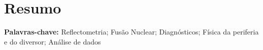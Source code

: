 
\section*{Resumo}



\vfill

\textbf{\Large Palavras-chave:} Reflectometria; Fusão Nuclear;  Diagnósticos; Física da periferia e do diversor; Análise de dados

